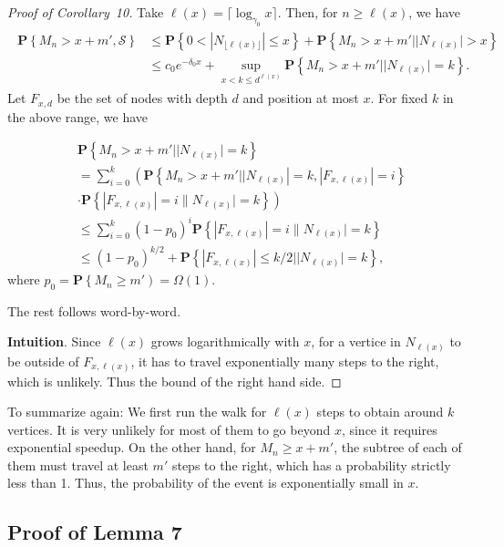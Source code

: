 \begin{proof}[Proof of Corollary~10]
Take $\ell(x) = \lceil \log _{\gamma_0} x \rceil$. Then, for $n \ge \ell(x)$, we have
\begin{align*}
    \begin{aligned}
    \mathbf{P}\left\{M_n>x + m', \mathscr{S}\right\} 
    & \leq \mathbf{P}\left\{0<\left|N_{\lfloor\ell(x)\rfloor}\right| \leq x\right\}+\mathbf{P}\left\{M_n>x + m' | | N_{\ell(x)} \mid>x\right\} \\
    & \leq c_0 e^{-\delta_0 x}+\sup _{x<k \leq d^{\ell(x)}} \mathbf{P}\left\{M_n>x + m'| | N_{\ell(x)} \mid=k\right\} .
    \end{aligned}
\end{align*}
Let $F_{x, d}$ be the set of nodes with depth $d$ and position at most $x$.
For fixed $k$ in the above range, we have

\[
\begin{aligned}
& \mathbf{P}\left\{M_n>x + m'| | N_{\ell(x)} \mid=k\right\} \\
& =\sum_{i=0}^k\left(\mathbf { P } \left\{M_n>x + m' | | N_{\ell(x)}\left|=k,\left|F_{x, \ell(x)}\right|=i\right\}\right.\right. \\
& \left.\cdot \mathbf{P}\left\{\left|F_{x, \ell(x)}\right|=i \| N_{\ell(x)} \mid=k\right\}\right) \\
& \leq \sum_{i=0}^k\left(1-p_0\right)^i \mathbf{P}\left\{\left|F_{x, \ell(x)}\right|=i \| N_{\ell(x)} \mid=k\right\} \\
& \leq\left(1-p_0\right)^{k / 2}+\mathbf{P}\left\{\left|F_{x, \ell(x)}\right| \leq k / 2| | N_{\ell(x)} \mid=k\right\} ,
\end{aligned}
\]
where $p_0 = \mathbf{P}\left\{M_n \geq m' \right) = \Omega(1)$.

The rest follows word-by-word. 

\textbf{Intuition}. Since $\ell(x)$ grows logarithmically with $x$, for a vertice in $N_{\ell(x)}$ to be outside of $F_{x, \ell(x)}$, it has to travel exponentially many steps to the right, which is unlikely. Thus the bound of the right hand side.
\end{proof}
To summarize again: We first run the walk for $\ell(x)$ steps to obtain around $k$ vertices. It is very unlikely for most of them to go beyond $x$, since it requires exponential speedup. On the other hand, for $M_n \ge x + m'$, the subtree of each of them must travel at least $m'$ steps to the right, which has a probability strictly less than 1. Thus, the probability of the event is exponentially small in $x$.


\subsection{Proof of Lemma 7}


